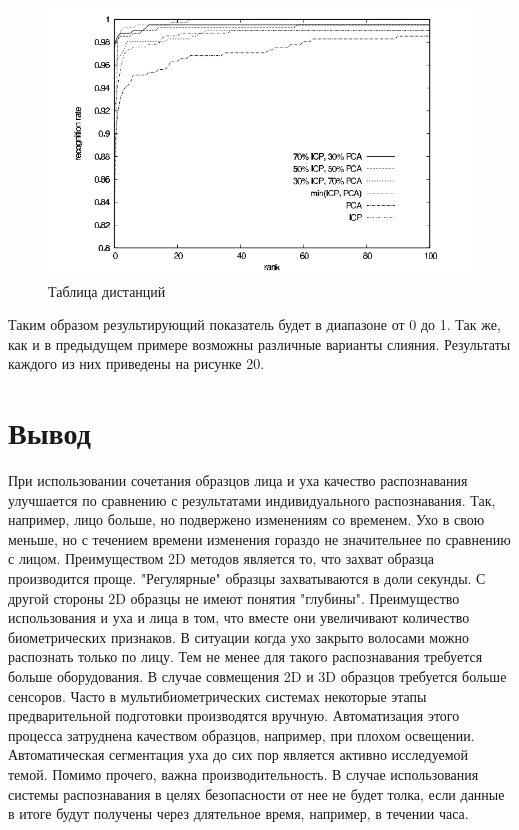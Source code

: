 \documentclass[12pt,a4paper]{article}					%
\begin{document}
\begin{figure}[h!]
\centering
\includegraphics[scale=0.60]{res/fusion_rates}
\caption{Таблица дистанций}
\end{figure}

Таким образом результирующий показатель будет в диапазоне от 0 до 1.
Так же, как и в предыдущем примере возможны различные варианты слияния. 
Результаты каждого из них приведены на рисунке 20.


\section{Вывод}

При использовании сочетания образцов лица и уха качество распознавания улучшается по сравнению с результатами индивидуального распознавания.
Так, например, лицо больше, но подвержено изменениям со временем. 
Ухо в свою меньше, но с течением времени изменения гораздо не значительнее по сравнению с лицом.
Преимуществом 2D методов является то, что захват образца производится проще.
"Регулярные" образцы захватываются в доли секунды.
С другой стороны 2D образцы не имеют понятия "глубины".
Преимущество использования и уха и лица в том, что вместе они увеличивают количество биометрических признаков.
В ситуации когда ухо закрыто волосами можно распознать только по лицу.
Тем не менее для такого распознавания требуется больше оборудования.
В случае совмещения 2D и 3D образцов требуется больше сенсоров.
Часто в мультибиометрических системах некоторые этапы предварительной подготовки производятся вручную.
Автоматизация этого процесса затруднена качеством образцов, например, при плохом освещении.
Автоматическая сегментация уха до сих пор является активно исследуемой темой.
Помимо прочего, важна производительность.
В случае использования системы распознавания в целях безопасности от нее не будет толка, если данные в итоге будут получены через длятельное время, например, в течении часа.
\end{document}
